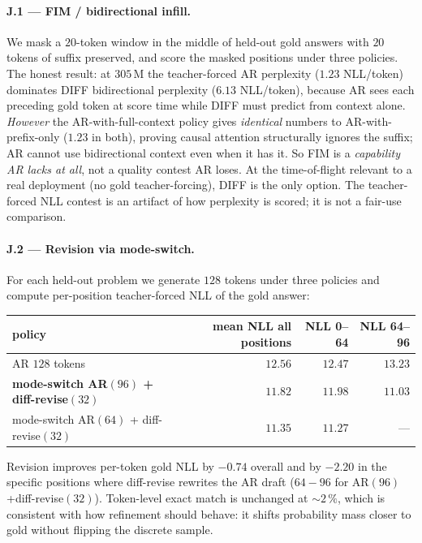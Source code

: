 \paragraph{J.1 — FIM / bidirectional infill.}
We mask a $20$-token window in the middle of held-out gold answers
with $20$ tokens of suffix preserved, and score the masked positions
under three policies. The honest result: at $305$\,M the
teacher-forced AR perplexity ($1.23$ NLL/token) dominates DIFF
bidirectional perplexity ($6.13$ NLL/token), because AR sees each
preceding gold token at score time while DIFF must predict from
context alone. \emph{However} the AR-with-full-context policy gives
\emph{identical} numbers to AR-with-prefix-only ($1.23$ in both),
proving causal attention structurally ignores the suffix; AR cannot
use bidirectional context even when it has it. So FIM is a
\emph{capability AR lacks at all}, not a quality contest AR loses.
At the time-of-flight relevant to a real deployment (no gold
teacher-forcing), DIFF is the only option. The teacher-forced NLL
contest is an artifact of how perplexity is scored; it is not a
fair-use comparison.

\paragraph{J.2 — Revision via mode-switch.}
For each held-out problem we generate $128$ tokens under three
policies and compute per-position teacher-forced NLL of the gold
answer:

\begin{center}
\begin{tabular}{lrrr}
\toprule
policy & mean NLL all positions & NLL 0--64 & NLL 64--96 \\
\midrule
AR $128$ tokens & $12.56$ & $12.47$ & $13.23$ \\
\textbf{mode-switch AR$(96)$ + diff-revise$(32)$} & $\mathbf{11.82}$ & $11.98$ & $\mathbf{11.03}$ \\
mode-switch AR$(64)$ + diff-revise$(32)$ & $\mathbf{11.35}$ & $\mathbf{11.27}$ & --- \\
\bottomrule
\end{tabular}
\end{center}

Revision improves per-token gold NLL by $-0.74$ overall and by
$-2.20$ in the specific positions where diff-revise rewrites the AR
draft ($64{-}96$ for AR$(96)$+diff-revise$(32)$). Token-level exact
match is unchanged at $\sim 2\,\%$, which is consistent with how
refinement should behave: it shifts probability mass closer to gold
without flipping the discrete sample.

